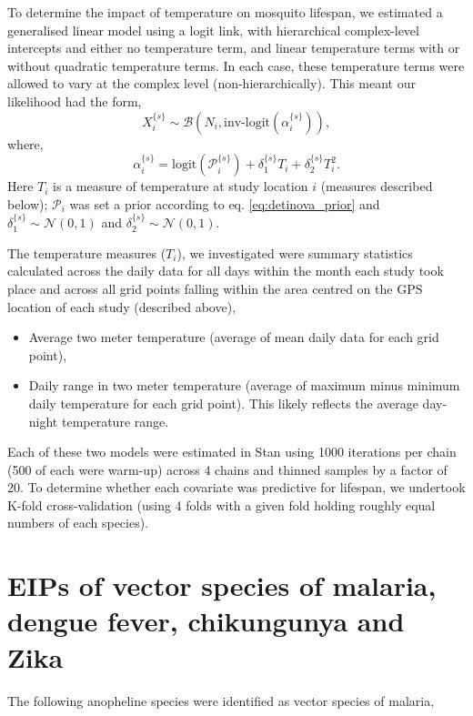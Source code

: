 \documentclass[12pt]{article}
\begin{document}
{To determine the impact of temperature on mosquito lifespan, we estimated a generalised linear model using a logit link, with hierarchical complex-level intercepts and either no temperature term, and linear temperature terms with or without quadratic temperature terms. In each case, these temperature terms were allowed to vary at the complex level (non-hierarchically). This meant our likelihood had the form,
%
\begin{equation}
X_i^{\{s\}} \sim \mathcal{B}(N_i, \text{inv-logit}(\alpha_i^{\{s\}})),
\end{equation}
%
where,
%
\begin{equation}
\alpha_i^{\{s\}} = \text{logit} (\mathcal{P}_i^{\{s\}}) + \delta_1^{\{s\}} T_i + \delta_2^{\{s\}} T_i^2.
\end{equation}
%
Here $T_i$ is a measure of temperature at study location $i$ (measures described below); $\mathcal{P}_i$ was set a prior according to eq. \eqref{eq:detinova_prior} and $\delta_1^{\{s\}}\sim \mathcal{N}(0, 1)$ and $\delta_2^{\{s\}}\sim \mathcal{N}(0, 1)$.

The temperature measures ($T_i$), we investigated were summary statistics calculated across the daily data for all days within the month each study took place and across all grid points falling within the area centred on the GPS location of each study (described above),

\begin{itemize}
	\item Average two meter temperature (average of mean daily data for each grid point),
	\item Daily range in two meter temperature (average of maximum minus minimum daily temperature for each grid point). This likely reflects the average day-night temperature range.
\end{itemize}

Each of these two models were estimated in Stan using 1000 iterations per chain (500 of each were warm-up) across 4 chains and thinned samples by a factor of 20. To determine whether each covariate was predictive for lifespan, we undertook K-fold cross-validation (using 4 folds with a given fold holding roughly equal numbers of each species). 

\section{EIPs of vector species of malaria, dengue fever, chikungunya and Zika}
The following anopheline species were identified as vector species of malaria,

}
\end{document}

